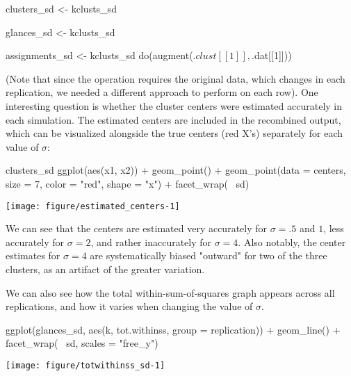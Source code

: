 \begin{example}
clusters_sd <- kclusts_sd %
\end{example}

\begin{example}
glances_sd <- kclusts_sd %
\end{example}

\begin{example}
assignments_sd <- kclusts_sd %
    do(augment(.$clust[[1]], .$dat[[1]]))
\end{example}


(Note that since the  operation requires the original data, which changes in each replication, we needed a different approach to perform  on each row). One interesting question is whether the cluster centers were estimated accurately in each simulation. The estimated centers are included in the recombined  output, which can be visualized alongside the true centers (red X's) separately for each value of $\sigma$:

\begin{center}

\begin{example}
clusters_sd %
    ggplot(aes(x1, x2)) + geom_point() +
    geom_point(data = centers, size = 7, color = "red", shape = "x") +
    facet_wrap(~ sd)
\end{example}

\texttt{[image: figure/estimated\_centers-1]} 
\end{center}

We can see that the centers are estimated very accurately for $\sigma = .5$ and $1$, less accurately for $\sigma = 2$, and rather inaccurately for $\sigma = 4$. Also notably, the center estimates for $\sigma = 4$ are systematically biased  "outward" for two of the three clusters, as an artifact of the greater variation.

We can also see how the total within-sum-of-squares graph appears across all replications, and how it varies when changing the value of $\sigma$.

\begin{center}

\begin{example}
ggplot(glances_sd, aes(k, tot.withinss, group = replication)) +
    geom_line() + facet_wrap(~ sd, scales = "free_y")
\end{example}

\texttt{[image: figure/totwithinss\_sd-1]} 
\end{center}

